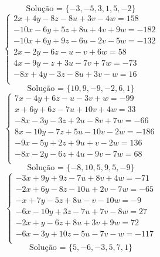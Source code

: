 \documentclass[12pt,oneside,a4paper]{article}
\begin{document}
\begin{equation*}
\text{Solução = }\{-3,-5,3,1,5,-2\}
\end{equation*}
\vspace{\baselineskip}
\begin{equation*}
\begin{cases}
2x+4y-8z-8u+3v-4w=158 \\
-10x-6y+5z+8u+4v+9w=-182 \\
-10x+6y+9z-6u-2v-5w=-132 \\
2x-2y-6z-u-v+6w=58 \\
4x-9y-z+3u-7v+7w=-73 \\
-8x+4y-3z-8u+3v-w=16 \\
\end{cases}
\end{equation*}
\begin{equation*}
\text{Solução = }\{10,9,-9,-2,6,1\}
\end{equation*}
\vspace{\baselineskip}
\begin{equation*}
\begin{cases}
7x-4y+6z-u-3v+w=-99 \\
x+6y+6z-7u+10v+4w=33 \\
-8x-3y-3z+2u-8v+7w=-66 \\
8x-10y-7z+5u-10v-2w=-186 \\
-9x-5y+2z+9u+v-2w=136 \\
-8x-2y-6z+4u-9v-7w=68 \\
\end{cases}
\end{equation*}
\begin{equation*}
\text{Solução = }\{-8,10,5,9,5,-9\}
\end{equation*}
\vspace{\baselineskip}
\begin{equation*}
\begin{cases}
-3x+9y+9z-7u+8v+4w=-71 \\
-2x+6y-8z-10u+2v-7w=-65 \\
-x+7y-5z+8u-v-10w=-9 \\
-6x-10y+3z-7u+7v-8w=27 \\
-2x+y-6z+8u+3v+9w=72 \\
-6x-3y+10z-5u-7v-w=-117 \\
\end{cases}
\end{equation*}
\begin{equation*}
\text{Solução = }\{5,-6,-3,5,7,1\}
\end{equation*}
\end{document}

